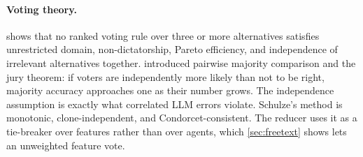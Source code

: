 \paragraph{Voting theory.} \citet{arrow1951social} shows that no ranked voting rule over three or more alternatives satisfies unrestricted domain, non-dictatorship, Pareto efficiency, and independence of irrelevant alternatives together. \citet{condorcet1785essai} introduced pairwise majority comparison and the jury theorem: if voters are independently more likely than not to be right, majority accuracy approaches one as their number grows. The independence assumption is exactly what correlated LLM errors violate. Schulze's method \citep{schulze2011new} is monotonic, clone-independent, and Condorcet-consistent. The reducer uses it as a tie-breaker over features rather than over agents, which \cref{sec:freetext} shows lets an unweighted feature vote.
